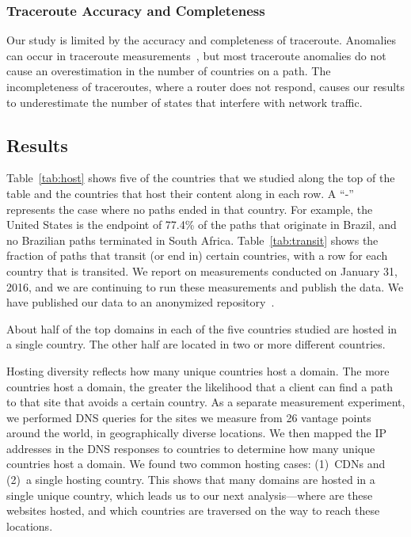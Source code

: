 \subsubsection{Traceroute Accuracy and Completeness}
Our study is limited by the accuracy and completeness of traceroute.
Anomalies can occur in traceroute
measurements~\cite{augustin2006avoiding}, but most traceroute anomalies
do not cause an overestimation in the number of countries on a path.  The
incompleteness of traceroutes, where a router does not respond, causes
our results to underestimate the number of states that interfere with network 
traffic.


\subsection{Results}



Table~\ref{tab:host} shows five of the countries that we studied along the top
of the table and the countries that host their content along in each row.  A
``-'' represents the case where no paths ended in that country. For example,
the United States is the endpoint of 77.4\% of the paths that originate in
Brazil, and no Brazilian paths terminated in South Africa.
Table~\ref{tab:transit} shows the fraction of paths that transit (or end in)
certain countries, with a row for each country that is transited.  We report 
on measurements conducted on January 31, 2016, and we are continuing to run 
these measurements and publish the data.  We have published our data 
to an anonymized repository~\cite{ransom_data}.

\begin{finding} About half of the top domains in each of
the five countries studied are hosted in a single country.  The other half are
located in two or more different countries. \end{finding} 

\noindent Hosting diversity reflects how many unique
countries host a domain.  The more countries host a domain, the greater the
likelihood that a client can find a path to that site that avoids a certain
country. As a separate measurement experiment, we performed DNS queries for the
sites we measure from 26 vantage points around the world, in
geographically diverse locations. We then mapped the IP addresses in the DNS
responses to countries to determine how many unique countries host a domain.
We found two common hosting cases:
(1)~CDNs and (2)~a single hosting country.  This shows that many domains are
hosted in a single unique country, which leads us to our next analysis---where
are these websites hosted, and which countries are traversed on the way to
reach these locations.


